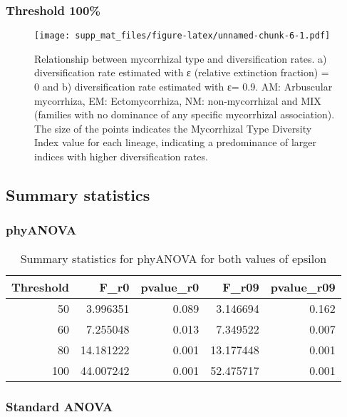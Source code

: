 \documentclass[]{article}
\begin{document}
\hypertarget{threshold-100}{%
\subsubsection{Threshold 100\%}\label{threshold-100}}

\begin{figure}
\centering
\texttt{[image: supp\_mat\_files/figure-latex/unnamed-chunk-6-1.pdf]}
\caption{Relationship between mycorrhizal type and diversification
rates. a) diversification rate estimated with ε (relative extinction
fraction) = 0 and b) diversification rate estimated with ε= 0.9. AM:
Arbuscular mycorrhiza, EM: Ectomycorrhiza, NM: non-mycorrhizal and MIX
(families with no dominance of any specific mycorrhizal association).
The size of the points indicates the Mycorrhizal Type Diversity Index
value for each lineage, indicating a predominance of larger indices with
higher diversification rates.}
\end{figure}

\hypertarget{summary-statistics}{%
\subsection{Summary statistics}\label{summary-statistics}}

\hypertarget{phyanova}{%
\subsubsection{phyANOVA}\label{phyanova}}

\begin{table}[H]

\caption{\label{tab:unnamed-chunk-7}Summary statistics for phyANOVA for both values of epsilon}
\centering
\begin{tabular}{r|r|r|r|r}
\hline
Threshold & F\_r0 & pvalue\_r0 & F\_r09 & pvalue\_r09\\
\hline
50 & 3.996351 & 0.089 & 3.146694 & 0.162\\
\hline
60 & 7.255048 & 0.013 & 7.349522 & 0.007\\
\hline
80 & 14.181222 & 0.001 & 13.177448 & 0.001\\
\hline
100 & 44.007242 & 0.001 & 52.475717 & 0.001\\
\hline
\end{tabular}
\end{table}

\hypertarget{standard-anova}{%
\subsubsection{Standard ANOVA}\label{standard-anova}}
\end{document}
